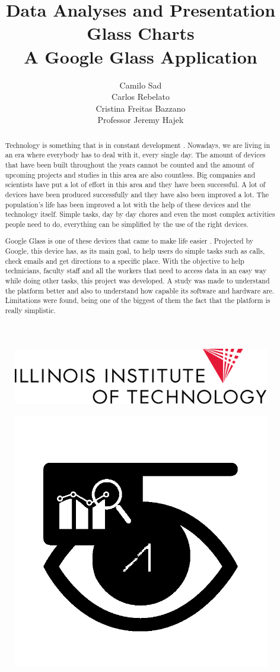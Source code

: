 \documentclass[a4paper,11pt]{article}
\author{ Camilo Sad  \\
 Carlos Rebelato \\
 Cristina Freitas Bazzano \\
 Professor Jeremy Hajek }
\begin{document}
\begin{figure}
\centering
\includegraphics[width = 0.7\linewidth]{images/IIT_Logo_stack_186_blk}
\label{iitlogo}
\end{figure}

\title{Data Analyses and Presentation \\
\large Glass Charts \\
A Google Glass Application}

\maketitle

\begin{figure}[H]
\centering
\includegraphics[width = 0.2\linewidth]{images/glass_charts_logo_black.png}
\label{projectlogo}
\end{figure}

\medskip

\begin{abstract}
Technology is something that is in constant development \cite{tecmundoandroid}. Nowadays, we are living in an era where everybody has to deal with it, every single day. The amount of devices that have been built throughout the years cannot be counted and the amount of upcoming projects and studies in this area are also countless. Big companies and scientists have put a lot of effort in this area and they have been successful. A lot of devices have been produced successfully and they have also been improved a lot. The population’s life has been improved a lot with the help of these devices and the technology itself. Simple tasks, day by day chores and even the most complex activities people need to do, everything can be simplified by the use of the right devices.

Google Glass is one of these devices that came to make life easier \cite{googleglassproject}. Projected by Google, this device has, as its main goal, to help users do simple tasks such as calls, check emails and get directions to a specific place. With the objective to help technicians, faculty staff and all the workers that need to access data in an easy way while doing other tasks, this project was developed. A study was made to understand the platform better and also to understand how capable its software and hardware are. Limitations were found, being one of the biggest of them the fact that the platform is really simplistic.
\end{abstract}
\end{document}
